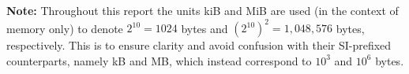     \noindent\textbf{Note:} Throughout this report the units kiB and MiB are used (in the
    context of memory only) to denote $2^{10} = 1024$ bytes and
    $(2^{10})^2=1,048,576$ bytes, respectively.  This is to ensure clarity and
    avoid confusion with their SI-prefixed counterparts, namely kB and MB, which
    instead correspond to $10^3$ and $10^6$ bytes.
